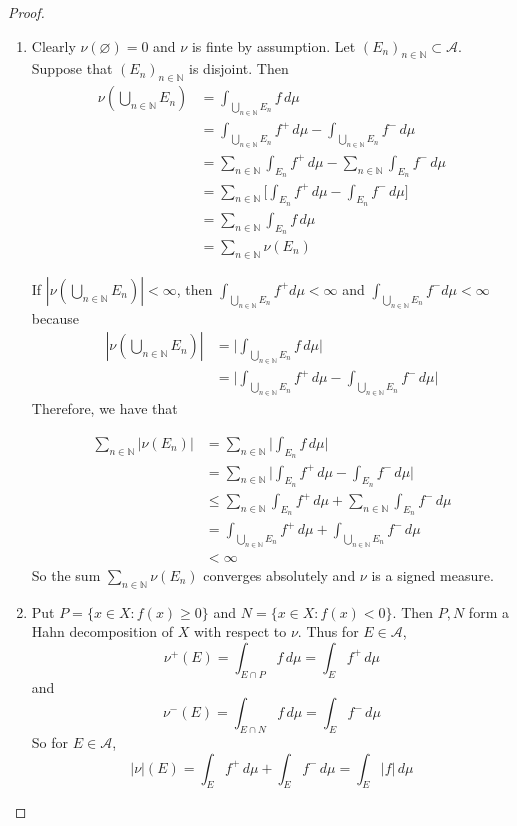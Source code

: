 \documentclass{book}
\theoremstyle{definition}
\newcommand{\N}{\mathbb{N}}
\newcommand{\MA}{\mathcal{A}}
\DeclareMathOperator*{\0}{\mbf{0}}
\DeclareMathOperator*{\1}{\mbf{1}}
\newcommand{\dmu}{\, d \mu}
\begin{document}
	\begin{proof}
		
		\begin{enumerate}
			
			\item Clearly $\nu(\varnothing) = 0$ and $\nu$ is finte by assumption. Let $(E_n)_{n \in \N} \subset \MA$. Suppose that $(E_n)_{n \in \N}$ is disjoint. Then 
			\begin{align*}
				\nu(\bigcup_{n \in \N} E_n)
				&= \int_{\bigcup_{n \in \N} E_n} f \dmu \\ 
				&= \int_{\bigcup_{n \in \N} E_n} f^+ \dmu - \int_{\bigcup_{n \in \N} E_n} f^- \dmu\\
				&= \sum_{n \in \N} \int_{ E_n} f^+ \dmu - \sum_{n \in \N} \int_{E_n} f^- \dmu\\
				&= \sum_{n \in \N} \bigg[ \int_{ E_n} f^+ \dmu - \int_{ E_n} f^- \dmu \bigg]\\
				&= \sum_{n \in \N} \int_{ E_n} f \dmu\\
				&= \sum_{n \in \N} \nu(E_n)
			\end{align*}
			
			If $|\nu(\bigcup_{n \in \N}E_n)| < \infty$, then $ \int_{\bigcup_{n \in \N} E_n} f^+ d  \mu < \infty$ and $ \int_{\bigcup_{n \in \N} E_n} f^- d  \mu < \infty$ because
			\begin{align*}
				|\nu(\bigcup_{n \in \N}E_n)|
				&=\bigg |\int_{\bigcup_{n \in \N} E_n} f \dmu\bigg| \\
				&= \bigg |\int_{\bigcup_{n \in \N} E_n} f^+ \dmu - \int_{\bigcup_{n \in \N} E_n} f^- \dmu \bigg|
			\end{align*} Therefore, we have that
			
			\begin{align*}
				\sum_{n \in \N} |\nu(E_n)|
				&=  \sum_{n \in \N} \bigg|\int_{E_n} f \dmu \bigg|\\
				&= \sum_{n \in \N} \bigg| \int_{E_n} f^+ \dmu -  \int_{E_n} f^- \dmu \bigg|\\
				& \leq \sum_{n \in \N}  \int_{E_n} f^+ \dmu  + \sum_{n \in \N}  \int_{E_n} f^- \dmu \\
				&= \int_{\bigcup_{n \in \N} E_n} f^+ \dmu + \int_{\bigcup_{n \in \N} E_n} f^- \dmu\\
				& < \infty
			\end{align*}
			So the sum $\sum_{n \in \N} \nu(E_n)$ converges absolutely and $\nu$ is a signed measure. 
			
			\item Put $P = \{x \in X: f(x) \geq 0\}$ and $N = \{x \in X: f(x) < 0\}$. Then $P,N$ form a Hahn decomposition of $X$ with respect to $\nu$. Thus for $E \in \MA$, 
			$$\nu^+(E) = \int_{E \cap P} f \dmu = \int_E f^+ \dmu$$ and $$\nu^-(E) = \int_{E \cap N} f \dmu = \int_E f^- \dmu$$
			 So for $E \in \MA$, $$|\nu|(E) = \int_E f^+ \dmu + \int_E f^- \dmu = \int_E |f| \dmu$$
		\end{enumerate}
	\end{proof}
	
\end{document}
